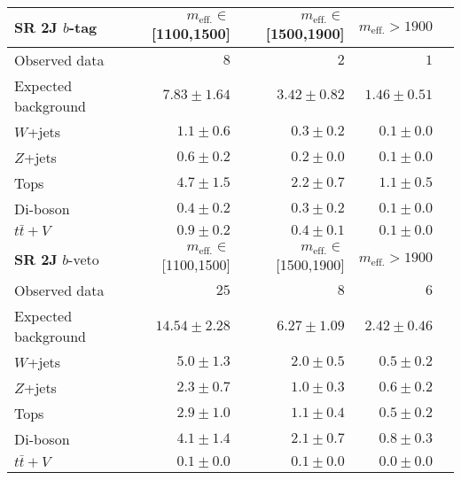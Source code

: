 \begin{tabular*}{\textwidth}{@{\extracolsep{\fill}}lrrrr}
\toprule
\textbf{SR 2J} $b$-tag & $m_{\mathrm{eff.}}\in$[1100,1500] & $m_{\mathrm{eff.}}\in$[1500,1900] & $m_{\mathrm{eff.}}>1900$ \\
\midrule

Observed data          & $8$              & $2$              & $1$                    \\
\midrule
Expected background         & $7.83 \pm 1.64$          & $3.42 \pm 0.82$          & $1.46 \pm 0.51$              \\
\midrule
        $W$+jets         & $1.1 \pm 0.6$          & $0.3 \pm 0.2$          & $0.1 \pm 0.0$              \\
        $Z$+jets         & $0.6 \pm 0.2$          & $0.2 \pm 0.0$          & $0.1 \pm 0.0$              \\
        Tops         & $4.7 \pm 1.5$          & $2.2 \pm 0.7$          & $1.1 \pm 0.5$              \\
        Di-boson         & $0.4 \pm 0.2$          & $0.3 \pm 0.2$          & $0.1 \pm 0.0$              \\
        $t\bar{t}+V$         & $0.9 \pm 0.2$          & $0.4 \pm 0.1$          & $0.1 \pm 0.0$              \\
\toprule
\textbf{SR 2J} $b$-veto & $m_{\mathrm{eff.}}\in$[1100,1500] & $m_{\mathrm{eff.}}\in$[1500,1900] & $m_{\mathrm{eff.}}>1900$ \\
\midrule
Observed data          & $25$              & $8$              & $6$                    \\
\midrule
Expected background         & $14.54 \pm 2.28$          & $6.27 \pm 1.09$          & $2.42 \pm 0.46$              \\
\midrule
        $W$+jets         & $5.0 \pm 1.3$          & $2.0 \pm 0.5$          & $0.5 \pm 0.2$              \\
        $Z$+jets         & $2.3 \pm 0.7$          & $1.0 \pm 0.3$          & $0.6 \pm 0.2$              \\
        Tops         & $2.9 \pm 1.0$          & $1.1 \pm 0.4$          & $0.5 \pm 0.2$              \\
        Di-boson         & $4.1 \pm 1.4$          & $2.1 \pm 0.7$          & $0.8 \pm 0.3$              \\
        $t\bar{t}+V$         & $0.1 \pm 0.0$          & $0.1 \pm 0.0$          & $0.0 \pm 0.0$              \\


\bottomrule
\end{tabular*}




